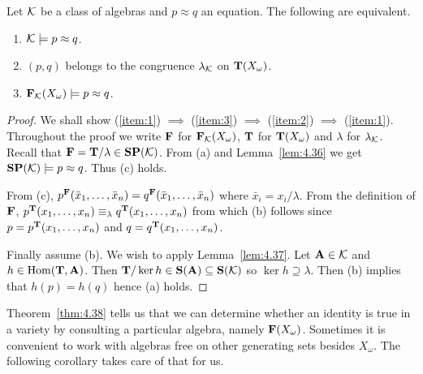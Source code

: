 \begin{theorem}
  \label{thm:4.38}  
  Let $\mathcal{K}$ be a class of algebras and $p \approx q$ an equation. The 
  following are equivalent.
  \begin{enumerate}
    \item \label{item:1} $\mathcal{K} \models p\approx q$.
    \item \label{item:2} $(p,q)$ belongs to the congruence $\lambda_{\mathcal{K}}$ on $\mathbf{T}(X_\omega)$.
    \item \label{item:3} $\mathbf{F}_{\mathcal{K}}(X_\omega) \models p\approx q$.
  \end{enumerate} 
\end{theorem}
\begin{proof} 
  We shall show 
  (\ref{item:1}) $\implies$ (\ref{item:3}) $\implies$ (\ref{item:2}) $\implies$ (\ref{item:1}).
  Throughout the proof we write $\mathbf{F}$ for $\mathbf{F}_{\mathcal{K}}(X_\omega)$, $\mathbf{T}$ for 
  $\mathbf{T}(X_\omega)$ and $\lambda$ for $\lambda_{\mathcal{K}}$. 
  Recall that $\mathbf{F} = \mathbf{T}/\lambda \in \mathbf{S}\mathbf{P}(\mathcal{K})$. 
  From (a) and Lemma~\ref{lem:4.36} we get $\mathbf{S}\mathbf{P}(\mathcal{K}) \models p \approx q$. 
  Thus (c) holds.

  From (c), $p^{\mathbf{F}}(\bar{x}_1,\dots, \bar{x}_n) = q^{\mathbf{F}}(\bar{x}_1,\dots, \bar{x}_n)$
  where $\bar{x}_i = x_i/\lambda$. From the definition of $\mathbf{F}$, 
  $p^{\mathbf{T}}(x_1,\dots, x_n) \equiv_\lambda q^{\mathbf{T}}(x_1,\dots, x_n)$
  from which (b) follows since $p = p^{\mathbf{T}}(x_1,\dots, x_n)$ and $q = q^{\mathbf{T}}(x_1,\dots, x_n)$.

  Finally assume (b). We wish to apply Lemma~\ref{lem:4.37}. 
  Let $\mathbf{A} \in \mathcal{K}$ and $h \in \operatorname{Hom}(\mathbf{T},\mathbf{A})$. 
  Then $\mathbf{T}/\ker h \in \mathbf{S}(\mathbf{A}) \subseteq \mathbf{S}(\mathcal{K})$ so $\ker h \supseteq \lambda$. 
  Then (b) implies that $h(p) = h(q)$ hence (a) holds.
\end{proof}

Theorem~\ref{thm:4.38} tells us that we can determine whether an identity is true 
in a variety by consulting a particular algebra, namely $\mathbf{F}(X_\omega)$. 
Sometimes it is convenient to work with algebras free on other generating sets besides 
$X_\omega$. The following corollary takes care of that for us.

